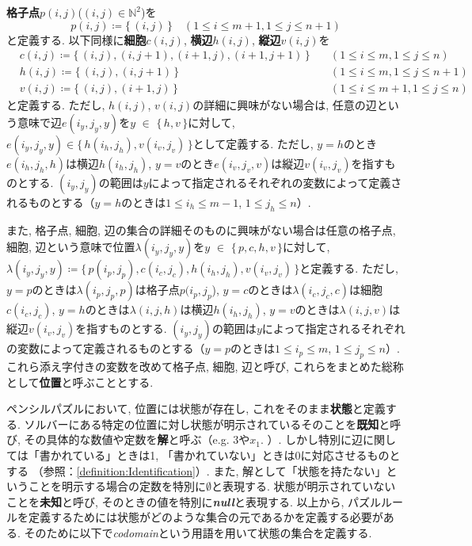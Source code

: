 \begin{definition}[格子点$p(i,j)$, 細胞$c(i,j)$, 横辺$h(i,j)$, 縦辺$v(i,j)$, 位置]\label{definition:VariableAtBoard}
  \textbf{格子点}$p(i,j)$($(i,j)\in \mathbb{N}^2$)を
  \begin{equation}
    p(i,j)\coloneqq \{\,(i,j)\,\} \quad (1\le i \le m+1, 1\le j \le n+1)
  \end{equation}
  と定義する. 以下同様に\textbf{細胞}$c(i,j)$, \textbf{横辺}$h(i,j)$, \textbf{縦辺}$v(i,j)$を
  \begin{align}
     & c(i,j)\coloneqq  \{\,(i,j), (i,j+1), (i+1,j), (i+1,j+1)\,\}  \quad & (1\le i \le m, 1\le j \le n)   \\
     & h(i,j)\coloneqq  \{\,(i,j), (i,j+1)\,\}                      \quad & (1\le i \le m, 1\le j \le n+1) \\
     & v(i,j)\coloneqq  \{\,(i,j), (i+1,j)\,\}                      \quad & (1\le i \le m+1, 1\le j \le n)
  \end{align}
  と定義する. ただし, $h(i,j)$, $v(i,j)$の詳細に興味がない場合は, 任意の辺という意味で辺$e(i_y,j_y,y)$を$y$ $\in$ $\{\,h,v\,\}$に対して, $e(i_y,j_y,y) \in \{\,h(i_h,j_h), v(i_v,j_v)\,\}$として定義する. ただし, $y=h$のとき$e(i_h,j_h,h)$は横辺$h(i_h,j_h)$, $y=v$のとき$e(i_v,j_v,v)$は縦辺$v(i_v,j_v)$を指すものとする. $(i_y,j_y)$の範囲は$y$によって指定されるそれぞれの変数によって定義されるものとする（$y=h$のときは$1\le i_h \le m-1$, $1\le j_h \le n$）.

  また, 格子点, 細胞, 辺の集合の詳細そのものに興味がない場合は任意の格子点, 細胞, 辺という意味で位置$\lambda(i_y,j_y,y)$を$y$ $\in$ $\{\,p,c,h,v\,\}$に対して, $\lambda(i_y,j_y,y) \coloneqq \{\,p(i_p,j_p),c(i_c,j_c),h(i_h,j_h),v(i_v,j_v)\,\}$と定義する. ただし, $y=p$のときは$\lambda(i_p,j_p,p)$は格子点$p(i_p,j_p$), $y=c$のときは$\lambda(i_c,j_c,c)$は細胞$c(i_c,j_c)$, $y=h$のときは$\lambda(i,j,h)$は横辺$h(i_h,j_h)$, $y=v$のときは$\lambda(i,j,v)$は縦辺$v(i_v,j_v)$を指すものとする. $(i_y,j_y)$の範囲は$y$によって指定されるそれぞれの変数によって定義されるものとする（$y=p$のときは$1\le i_p \le m$, $1\le j_p \le n$）.
  これら添え字付きの変数を改めて格子点, 細胞, 辺と呼び, これらをまとめた総称として\textbf{位置}と呼ぶこととする.
\end{definition}
ペンシルパズルにおいて, 位置には状態が存在し, これをそのまま\textbf{状態}と定義する. ソルバーにある特定の位置に対し状態が明示されているそのことを\textbf{既知}と呼び, その具体的な数値や定数を\textbf{解}と呼ぶ（e.g. 3や$x_1$. ）. しかし特別に辺に関しては「書かれている」ときは1, 「書かれていない」ときは0に対応させるものとする （参照：\cref{definition:Identification}）. また, 解として「状態を持たない」ということを明示する場合の定数を特別に$\emptyset$と表現する. 状態が明示されていないことを\textbf{未知}と呼び, そのときの値を特別に\textbf{\textit{null}}と表現する.
以上から, パズルルールを定義するためには状態がどのような集合の元であるかを定義する必要がある. そのために以下で\textit{codomain}という用語を用いて状態の集合を定義する.

